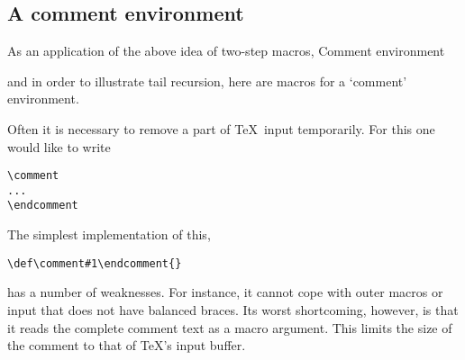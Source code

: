 \subsection{A comment environment}

As an application of the above idea of two-step macros,
\howto Comment environment\par
and in order to illustrate tail recursion, here are 
macros for a `comment' environment.

Often it is necessary to remove a part of \TeX\
input temporarily. For this one would like to
write
\begin{verbatim}
\comment
...
\endcomment
\end{verbatim}
The simplest implementation of this, 
\begin{verbatim}
\def\comment#1\endcomment{}
\end{verbatim} 
has a number of weaknesses. For instance,
it cannot cope with outer macros or input that 
does not have balanced braces. Its worst
shortcoming, however, is that it reads the complete
comment text as a macro argument. This limits the size
of the comment to that of \TeX's input buffer.

